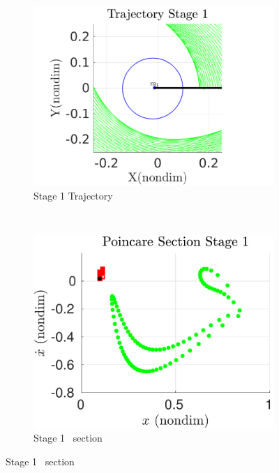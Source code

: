 \documentclass[smallcondensed]{svjour3}
\begin{document}
\begin{figure}[htbp]
    \centering
    \begin{subfigure}[htbp]{0.5\textwidth} 
        \includegraphics[width=\textwidth, keepaspectratio]{figures/geo_transfer/stage1_trajectory_zoom.pdf} 
        \caption{Stage 1 Trajectory~\label{fig:stage1_trajecotry_zoom}} 
    \end{subfigure}~
    \begin{subfigure}[htbp]{0.5\textwidth} 
        \includegraphics[width=\textwidth, keepaspectratio]{figures/geo_transfer/stage1_poincare.pdf} 
        \caption{Stage 1 \Poincare~section \label{fig:stage1_poincare}} 
    \end{subfigure}



\end{figure}
\end{document}
